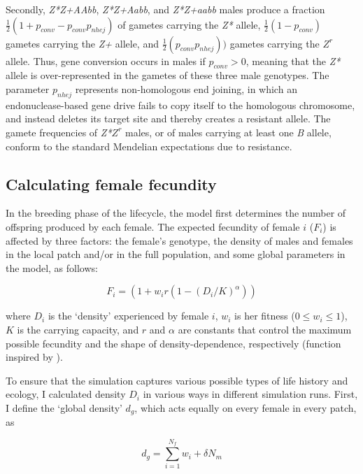 \documentclass[]{rsos}%
\begin{document}
Secondly, \emph{Z*Z+AAbb}, \emph{Z*Z+Aabb}, and \emph{Z*Z+aabb} males
produce a fraction \(\frac{1}{2}(1 + p_{conv} - p_{conv} p_{nhej})\) of
gametes carrying the \emph{Z*} allele, \(\frac{1}{2}(1 - p_{conv})\)
gametes carrying the \emph{Z+} allele, and
\(\frac{1}{2}(p_{conv} p_{nhej}))\) gametes carrying the \(Z^r\) allele.
Thus, gene conversion occurs in males if \(p_{conv} > 0\), meaning that
the \emph{Z*} allele is over-represented in the gametes of these three
male genotypes. The parameter \(p_{nhej}\) represents non-homologous end
joining, in which an endonuclease-based gene drive fails to copy itself
to the homologous chromosome, and instead deletes its target site and
thereby creates a resistant allele. The gamete frequencies of
\emph{Z*}\(Z^r\) males, or of males carrying at least one \emph{B}
allele, conform to the standard Mendelian expectations due to
resistance.

\hypertarget{calculating-female-fecundity}{%
\subsection{Calculating female
fecundity}\label{calculating-female-fecundity}}

In the breeding phase of the lifecycle, the model first determines the
number of offspring produced by each female. The expected fecundity of
female \(i\) (\(F_i\)) is affected by three factors: the female's
genotype, the density of males and females in the local patch and/or in
the full population, and some global parameters in the model, as
follows:

\[F_i = (1 + w_i r(1 - (D_i / K) ^ \alpha))\]

where \(D_i\) is the `density' experienced by female \(i\), \(w_i\) is
her fitness (\(0 \le w_i \le 1\)), \(K\) is the carrying capacity, and
\(r\) and \(\alpha\) are constants that control the maximum possible
fecundity and the shape of density-dependence, respectively (function
inspired by \citep{fowler1981de}).

To ensure that the simulation captures various possible types of life
history and ecology, I calculated density \(D_i\) in various ways in
different simulation runs. First, I define the `global density' \(d_g\),
which acts equally on every female in every patch, as

\[d_g = \sum_{i=1}^{N_f} w_i + \delta N_m\]
\end{document}
